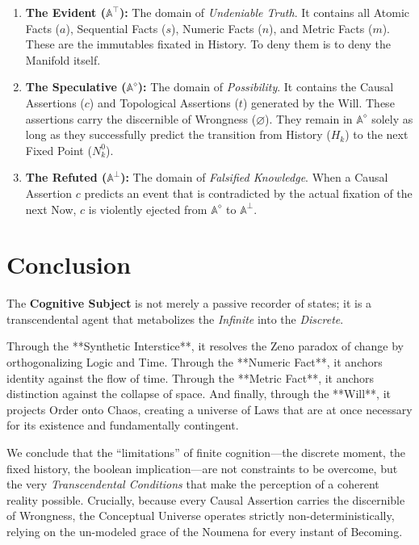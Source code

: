 \documentclass[11pt, a4paper]{article}
\theoremstyle{formalism}
\begin{document}
\begin{enumerate}
    \item \textbf{The Evident ($\mathbb{A}^\top$):} 
    The domain of \textit{Undeniable Truth}. It contains all Atomic Facts ($a$), Sequential Facts ($s$), Numeric Facts ($n$), and Metric Facts ($m$). These are the immutables fixated in History. To deny them is to deny the Manifold itself.

    \item \textbf{The Speculative ($\mathbb{A}^\diamond$):} 
    The domain of \textit{Possibility}. It contains the Causal Assertions ($c$) and Topological Assertions ($t$) generated by the Will. These assertions carry the discernible of Wrongness ($\varnothing$). They remain in $\mathbb{A}^\diamond$ solely as long as they successfully predict the transition from History ($H_k$) to the next Fixed Point ($N^0_k$).

    \item \textbf{The Refuted ($\mathbb{A}^\bot$):} 
    The domain of \textit{Falsified Knowledge}. When a Causal Assertion $c$ predicts an event that is contradicted by the actual fixation of the next Now, $c$ is violently ejected from $\mathbb{A}^\diamond$ to $\mathbb{A}^\bot$.
\end{enumerate}

\section{Conclusion}

The \textbf{Cognitive Subject} is not merely a passive recorder of states; it is a transcendental agent that metabolizes the \textit{Infinite} into the \textit{Discrete}. 

Through the **Synthetic Interstice**, it resolves the Zeno paradox of change by orthogonalizing Logic and Time. Through the **Numeric Fact**, it anchors identity against the flow of time. Through the **Metric Fact**, it anchors distinction against the collapse of space. And finally, through the **Will**, it projects Order onto Chaos, creating a universe of Laws that are at once necessary for its existence and fundamentally contingent.

We conclude that the ``limitations'' of finite cognition---the discrete moment, the fixed history, the boolean implication---are not constraints to be overcome, but the very \textit{Transcendental Conditions} that make the perception of a coherent reality possible. Crucially, because every Causal Assertion carries the discernible of Wrongness, the Conceptual Universe operates strictly non-deterministically, relying on the un-modeled grace of the Noumena for every instant of Becoming.
\end{document}
